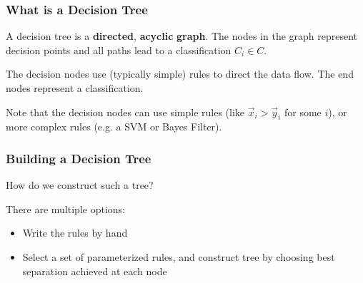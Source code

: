 \documentclass[mathserif,serif]{beamer}
\begin{document}
\begin{frame}
  \frametitle{What is a Decision Tree}

  A decision tree is a \textbf{directed}, \textbf{acyclic} \textbf{graph}. The nodes in the graph
  represent decision points and all paths lead to a classification $C_i \in C$.
  \begin{center}
  \end{center}

  \pause
  The decision nodes use (typically simple) rules to direct the data flow. The end nodes
  represent a classification.

  \pause
  Note that the decision nodes can use simple rules (like $\vec x_i > \vec y_i$ for some $i$), or
  more complex rules (e.g. a SVM or Bayes Filter).
\end{frame}

\begin{frame}
  \frametitle{Building a Decision Tree}
  How do we construct such a tree?

  \pause
  There are multiple options:
  \begin{itemize}
    \pause\item Write the rules by hand
    \pause\item Select a set of parameterized rules, and construct tree by choosing best separation
      achieved at each node
  \end{itemize}
\end{frame}
\end{document}
